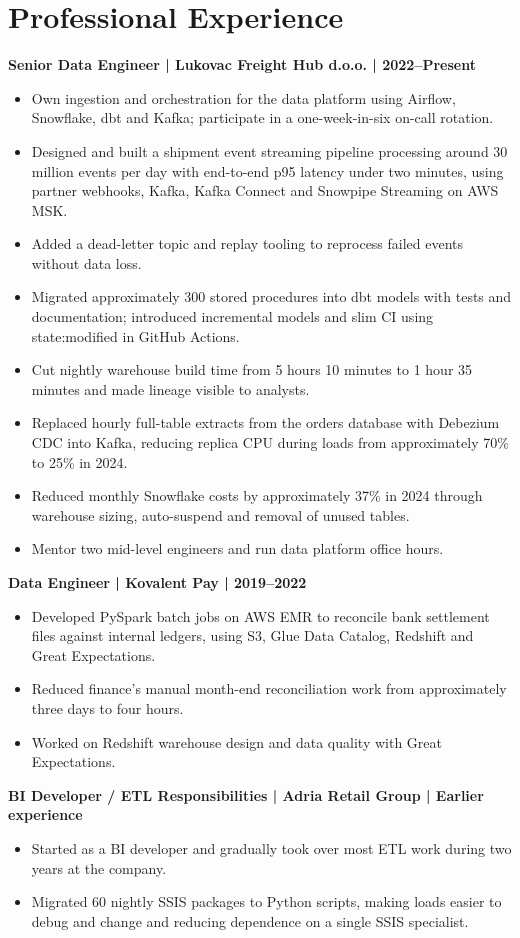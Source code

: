 \documentclass[11pt,a4paper]{article}
\newcommand{\cvsection}[1]{\section*{#1}}
\newcommand{\cvrole}[1]{\par\noindent\textbf{#1}\par}
\begin{document}
\cvsection{Professional Experience}
\cvrole{Senior Data Engineer | Lukovac Freight Hub d.o.o. | 2022–Present}
\begin{itemize}
\item Own ingestion and orchestration for the data platform using Airflow, Snowflake, dbt and Kafka; participate in a one-week-in-six on-call rotation.
\item Designed and built a shipment event streaming pipeline processing around 30 million events per day with end-to-end p95 latency under two minutes, using partner webhooks, Kafka, Kafka Connect and Snowpipe Streaming on AWS MSK.
\item Added a dead-letter topic and replay tooling to reprocess failed events without data loss.
\item Migrated approximately 300 stored procedures into dbt models with tests and documentation; introduced incremental models and slim CI using state:modified in GitHub Actions.
\item Cut nightly warehouse build time from 5 hours 10 minutes to 1 hour 35 minutes and made lineage visible to analysts.
\item Replaced hourly full-table extracts from the orders database with Debezium CDC into Kafka, reducing replica CPU during loads from approximately 70\% to 25\% in 2024.
\item Reduced monthly Snowflake costs by approximately 37\% in 2024 through warehouse sizing, auto-suspend and removal of unused tables.
\item Mentor two mid-level engineers and run data platform office hours.
\end{itemize}

\newpage
\cvrole{Data Engineer | Kovalent Pay | 2019–2022}
\begin{itemize}
\item Developed PySpark batch jobs on AWS EMR to reconcile bank settlement files against internal ledgers, using S3, Glue Data Catalog, Redshift and Great Expectations.
\item Reduced finance's manual month-end reconciliation work from approximately three days to four hours.
\item Worked on Redshift warehouse design and data quality with Great Expectations.
\end{itemize}

\cvrole{BI Developer / ETL Responsibilities | Adria Retail Group | Earlier experience}
\begin{itemize}
\item Started as a BI developer and gradually took over most ETL work during two years at the company.
\item Migrated 60 nightly SSIS packages to Python scripts, making loads easier to debug and change and reducing dependence on a single SSIS specialist.
\end{itemize}
\end{document}
